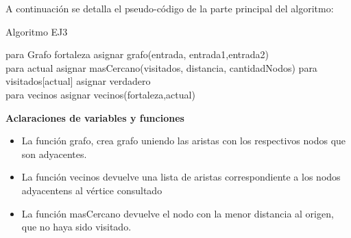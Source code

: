 A continuaci\'on se detalla el pseudo-c\'odigo de la parte principal del algoritmo:

\begin{algorithm}[H] %
 \caption{Algoritmo EJ3}
 	para Grafo fortaleza asignar grafo(entrada, entrada1,entrada2)\\
 	{
	para actual asignar masCercano(visitados, distancia, cantidadNodos)
	para visitados[actual] asignar verdadero\\
	para vecinos asignar vecinos(fortaleza,actual)\\
 	}
\end{algorithm}


\textbf{Aclaraciones de variables y funciones}
\begin{itemize}
\item La funci\'on grafo, crea grafo uniendo las aristas con los respectivos nodos que son adyacentes.
\item La funci\'on vecinos devuelve una lista de aristas correspondiente a los nodos adyacentens al v\'ertice consultado
\item La funci\'on masCercano devuelve el nodo con la menor distancia al origen, que no haya sido visitado. 
\end{itemize}
